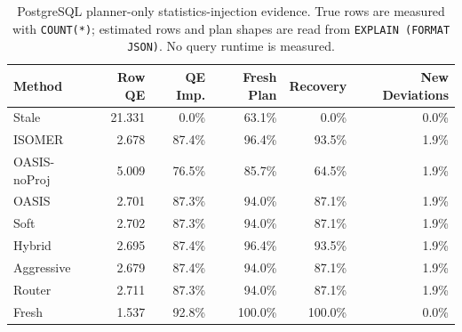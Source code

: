 \begin{table}[t]
  \centering
  \small
  \caption{PostgreSQL planner-only statistics-injection evidence. True rows are measured with \texttt{COUNT(*)}; estimated rows and plan shapes are read from \texttt{EXPLAIN (FORMAT JSON)}. No query runtime is measured.}
  \label{tab:postgres_planner_stats_injection}
  \setlength{\tabcolsep}{4pt}
  \begin{tabular}{lrrrrr}
    \toprule
    Method & Row QE & QE Imp. & Fresh Plan & Recovery & New Deviations \\
    \midrule
    Stale & 21.331 & 0.0\% & 63.1\% & 0.0\% & 0.0\% \\
    ISOMER & 2.678 & 87.4\% & 96.4\% & 93.5\% & 1.9\% \\
    OASIS-noProj & 5.009 & 76.5\% & 85.7\% & 64.5\% & 1.9\% \\
    OASIS & 2.701 & 87.3\% & 94.0\% & 87.1\% & 1.9\% \\
    Soft & 2.702 & 87.3\% & 94.0\% & 87.1\% & 1.9\% \\
    Hybrid & 2.695 & 87.4\% & 96.4\% & 93.5\% & 1.9\% \\
    Aggressive & 2.679 & 87.4\% & 94.0\% & 87.1\% & 1.9\% \\
    Router & 2.711 & 87.3\% & 94.0\% & 87.1\% & 1.9\% \\
    Fresh & 1.537 & 92.8\% & 100.0\% & 100.0\% & 0.0\% \\
    \bottomrule
  \end{tabular}
\end{table}

